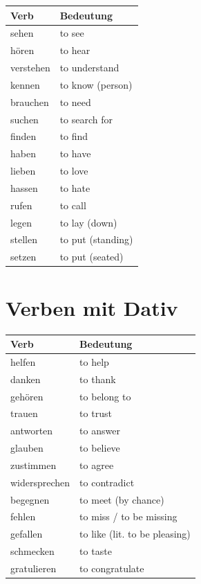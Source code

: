 \bigskip
\begin{center}
\begin{tabular}{|l|p{6cm}|}
\hline
Verb & Bedeutung \\ \hline
sehen & to see \\ \hline
hören & to hear \\ \hline
verstehen & to understand \\ \hline
kennen & to know (person) \\ \hline
brauchen & to need \\ \hline
suchen & to search for \\ \hline
finden & to find \\ \hline
haben & to have \\ \hline
lieben & to love \\ \hline
hassen & to hate \\ \hline
rufen & to call \\ \hline
legen & to lay (down) \\ \hline
stellen & to put (standing) \\ \hline
setzen & to put (seated) \\ \hline
\end{tabular}
\end{center}

\section{Verben mit Dativ}

\bigskip
\begin{center}
\begin{tabular}{|l|p{6cm}|}
\hline
Verb & Bedeutung \\ \hline
helfen & to help \\ \hline
danken & to thank \\ \hline
gehören & to belong to \\ \hline
trauen & to trust \\ \hline
antworten & to answer \\ \hline
glauben & to believe \\ \hline
zustimmen & to agree \\ \hline
widersprechen & to contradict \\ \hline
begegnen & to meet (by chance) \\ \hline
fehlen & to miss / to be missing \\ \hline
gefallen & to like (lit. to be pleasing) \\ \hline
schmecken & to taste \\ \hline
gratulieren & to congratulate \\ \hline
\end{tabular}
\end{center}


